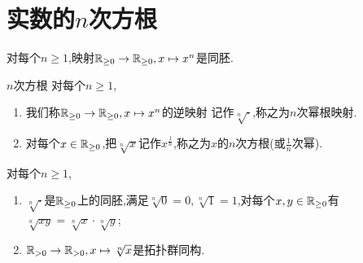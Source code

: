 \section{实数的\texorpdfstring{$n$}{n}次方根}

\begin{proposition}{}{}
	对每个$n\geq 1$,映射$\mathbb{R}_{\geq 0}\to\mathbb{R}_{\geq 0},x\mapsto x^{n}$是同胚.
\end{proposition}

\begin{definition}{$n$次方根}{}
	对每个$n\geq 1$,
	\begin{enumerate}
		\item 我们称$\mathbb{R}_{\geq 0}\to\mathbb{R}_{\geq 0},x\mapsto x^{n}$的逆映射
		记作$\sqrt[n]{\cdot}$,称之为$n$次幂根映射.
		\item 对每个$x\in\mathbb{R}_{\geq 0}$,把$\sqrt[n]{x}$记作$x^{\frac{1}{n}}$,称之为$x$的$n$次方根(或$\frac{1}{n}$次幂).
	\end{enumerate}
\end{definition}

\begin{proposition}{}{}
	对每个$n\geq 1$,
	\begin{enumerate}
		\item $\sqrt[n]{\cdot}$是$\mathbb{R}_{\geq 0}$上的同胚,满足$\sqrt[n]{0}=0,\sqrt[n]{1}=1$,对每个$x,y\in\mathbb{R}_{\geq 0}$有$\sqrt[n]{xy}=\sqrt[n]{x}\cdot\sqrt[n]{y}$;
		\item $\mathbb{R}_{>0}\to\mathbb{R}_{>0},x\mapsto\sqrt[n]{x}$是拓扑群同构.
	\end{enumerate}
\end{proposition}
